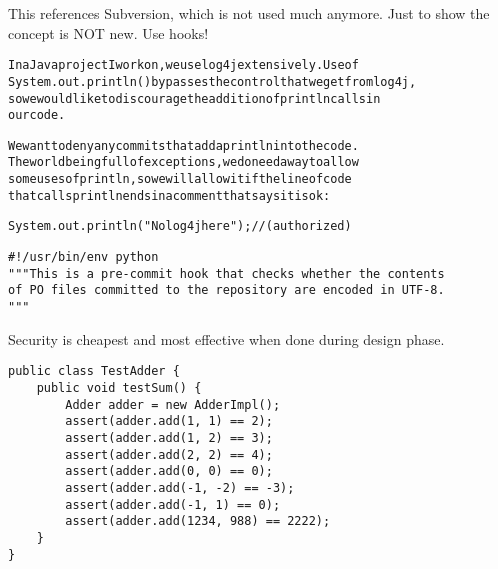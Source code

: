 \documentclass[Screen16to9,17pt]{foils}
\begin{document}
This references Subversion, which is not used much anymore. Just to show the concept is NOT new. Use hooks!


\begin{alltt}
In a Java project I work on, we use log4j extensively.  Use of
System.out.println() bypasses the control that we get from log4j,
so we would like to discourage the addition of println calls in
our code.

We want to deny any commits that add a println into the code.
The world being full of exceptions, we do need a way to allow
some uses of println, so we will allow it if the line of code
that calls println ends in a comment that says it is ok:

   System.out.println("No log4j here"); // (authorized)
\end{alltt}

{\small {}}



\begin{verbatim}
#!/usr/bin/env python
"""This is a pre-commit hook that checks whether the contents
of PO files committed to the repository are encoded in UTF-8.
"""
\end{verbatim}

{\small {}}


\centerline{Security is cheapest and most effective when done during design phase.}







\begin{verbatim}
public class TestAdder {
    public void testSum() {
        Adder adder = new AdderImpl();
        assert(adder.add(1, 1) == 2);
        assert(adder.add(1, 2) == 3);
        assert(adder.add(2, 2) == 4);
        assert(adder.add(0, 0) == 0);
        assert(adder.add(-1, -2) == -3);
        assert(adder.add(-1, 1) == 0);
        assert(adder.add(1234, 988) == 2222);
    }
}
\end{verbatim}
\end{document}
